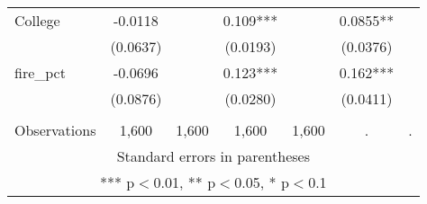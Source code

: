 \begin{tabular}{lcccccc}
College & -0.0118 &  & 0.109*** &  & 0.0855** &  \\
 & (0.0637) &  & (0.0193) &  & (0.0376) &  \\
fire\_pct & -0.0696 &  & 0.123*** &  & 0.162*** &  \\
 & (0.0876) &  & (0.0280) &  & (0.0411) &  \\
 &  &  &  &  &  &  \\
 Observations & 1,600 & 1,600 & 1,600 & 1,600 & . & . \\ \hline
\multicolumn{7}{c}{ Standard errors in parentheses} \\
\multicolumn{7}{c}{ *** p$<$0.01, ** p$<$0.05, * p$<$0.1} \\
\end{tabular}
